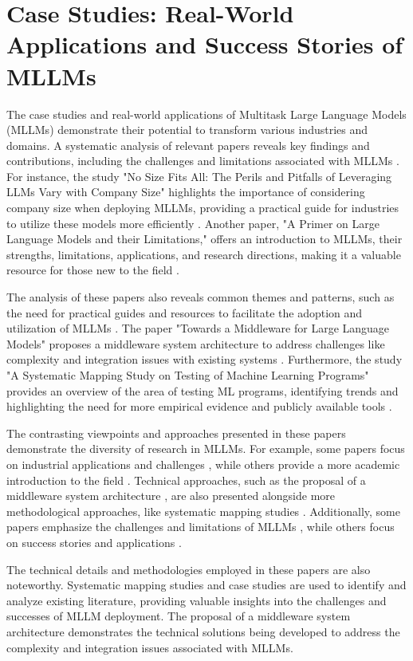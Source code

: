 \documentclass[conference]{IEEEtran}
\begin{document}
\section{Case Studies: Real-World Applications and Success Stories of MLLMs}
The case studies and real-world applications of Multitask Large Language Models (MLLMs) demonstrate their potential to transform various industries and domains. A systematic analysis of relevant papers reveals key findings and contributions, including the challenges and limitations associated with MLLMs \cite{b1}. For instance, the study "No Size Fits All: The Perils and Pitfalls of Leveraging LLMs Vary with Company Size" highlights the importance of considering company size when deploying MLLMs, providing a practical guide for industries to utilize these models more efficiently \cite{b2}. Another paper, "A Primer on Large Language Models and their Limitations," offers an introduction to MLLMs, their strengths, limitations, applications, and research directions, making it a valuable resource for those new to the field \cite{b3}.

The analysis of these papers also reveals common themes and patterns, such as the need for practical guides and resources to facilitate the adoption and utilization of MLLMs \cite{b4}. The paper "Towards a Middleware for Large Language Models" proposes a middleware system architecture to address challenges like complexity and integration issues with existing systems \cite{b5}. Furthermore, the study "A Systematic Mapping Study on Testing of Machine Learning Programs" provides an overview of the area of testing ML programs, identifying trends and highlighting the need for more empirical evidence and publicly available tools \cite{b6}.

The contrasting viewpoints and approaches presented in these papers demonstrate the diversity of research in MLLMs. For example, some papers focus on industrial applications and challenges \cite{b2}, while others provide a more academic introduction to the field \cite{b3}. Technical approaches, such as the proposal of a middleware system architecture \cite{b5}, are also presented alongside more methodological approaches, like systematic mapping studies \cite{b6}. Additionally, some papers emphasize the challenges and limitations of MLLMs \cite{b1}, while others focus on success stories and applications \cite{b2}.

The technical details and methodologies employed in these papers are also noteworthy. Systematic mapping studies \cite{b6} and case studies \cite{b2} are used to identify and analyze existing literature, providing valuable insights into the challenges and successes of MLLM deployment. The proposal of a middleware system architecture \cite{b5} demonstrates the technical solutions being developed to address the complexity and integration issues associated with MLLMs.
\end{document}
